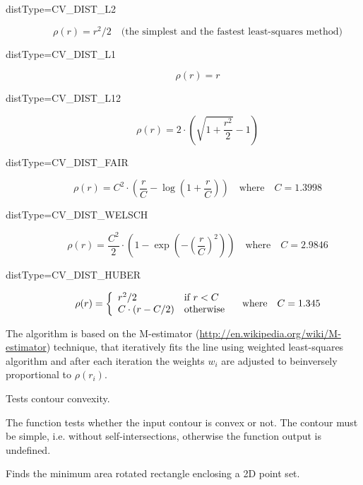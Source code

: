 \begin{description}
\item[distType=CV\_DIST\_L2]
\[ \rho(r) = r^2/2 \quad \text{(the simplest and the fastest least-squares method)} \]

\item[distType=CV\_DIST\_L1]
\[ \rho(r) = r \]

\item[distType=CV\_DIST\_L12]
\[ \rho(r) = 2 \cdot (\sqrt{1 + \frac{r^2}{2}} - 1) \]

\item[distType=CV\_DIST\_FAIR]
\[ \rho\left(r\right) = C^2 \cdot \left( \frac{r}{C} - \log{\left(1 + \frac{r}{C}\right)}\right) \quad \text{where} \quad C=1.3998 \]

\item[distType=CV\_DIST\_WELSCH]
\[ \rho\left(r\right) = \frac{C^2}{2} \cdot \left( 1 - \exp{\left(-\left(\frac{r}{C}\right)^2\right)}\right) \quad \text{where} \quad C=2.9846 \]

\item[distType=CV\_DIST\_HUBER]
\[ \rho(r) = \left\{ \begin{array}{l l} r^2/2 & \mbox{if $r < C$}\\ C \cdot (r-C/2) & \mbox{otherwise}\\ \end{array} \right.  \quad \text{where} \quad C=1.345
\]
\end{description}

The algorithm is based on the M-estimator (\url{http://en.wikipedia.org/wiki/M-estimator}) technique, that iteratively fits the line using weighted least-squares algorithm and after each iteration the weights $w_i$ are adjusted to beinversely proportional to $\rho(r_i)$. 


Tests contour convexity.

\begin{description}
\end{description}

The function tests whether the input contour is convex or not. The contour must be simple, i.e. without self-intersections, otherwise the function output is undefined.


Finds the minimum area rotated rectangle enclosing a 2D point set.

\begin{description}
\end{description}

